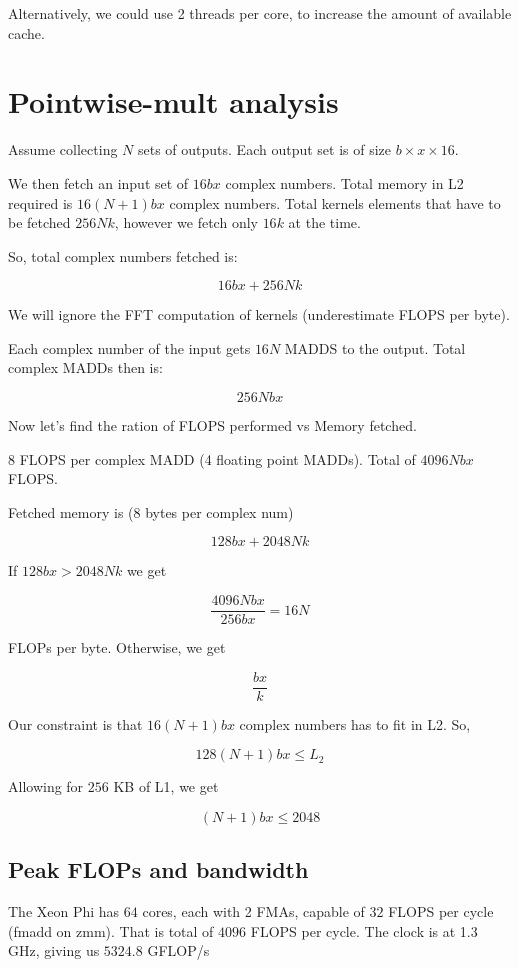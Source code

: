   Alternatively, we could use 2 threads per core, to increase the
  amount of available cache.



\section{Pointwise-mult analysis}

  Assume collecting $N$ sets of outputs.  Each output set is of size
  $b \times x \times 16$.

  We then fetch an input set of $16bx$ complex numbers.  Total memory
  in L2 required is $16(N+1)bx$ complex numbers.  Total kernels
  elements that have to be fetched $256Nk$, however we fetch only
  $16k$ at the time.

  So, total complex numbers fetched is:

  $$16bx + 256Nk$$

  We will ignore the FFT computation of kernels (underestimate FLOPS
  per byte).

  Each complex number of the input gets $16N$ MADDS to the output.
  Total complex MADDs then is:

  $$256Nbx$$

  Now let's find the ration of FLOPS performed vs Memory fetched.

  $8$ FLOPS per complex MADD (4 floating point MADDs).  Total of
  $4096Nbx$ FLOPS.

  Fetched memory is ($8$ bytes per complex num)

  $$128bx + 2048Nk$$

  If $128bx > 2048Nk$ we get

  $$\frac{4096Nbx}{256bx} = 16N$$

  FLOPs per byte.  Otherwise, we get

  $$\frac{bx}{k}$$

  Our constraint is that $16(N+1)bx$ complex numbers has to fit in L2.
  So,

  $$128(N+1)bx \le L_2$$

  Allowing for $256$ KB of L1, we get

  $$(N+1)bx \le 2048$$

  \subsection{Peak FLOPs and bandwidth}

  The Xeon Phi has $64$ cores, each with 2 FMAs, capable of $32$ FLOPS
  per cycle (fmadd on zmm).  That is total of $4096$ FLOPS per cycle.
  The clock is at 1.3 GHz, giving us $5324.8$ GFLOP/s


